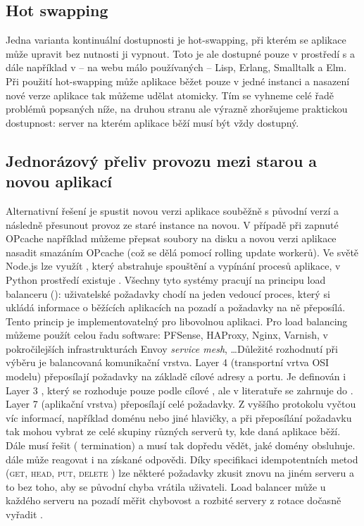         \subsection*{Hot swapping}
            Jedna varianta kontinuální dostupnosti je hot-swapping, při kterém se aplikace může upravit bez nutnosti ji vypnout. Toto je ale dostupné pouze v prostředí s  a dále například v -- na webu málo používaných -- Lisp, Erlang, Smalltalk a Elm. Při použití hot-swapping může aplikace běžet pouze v jedné instanci a nasazení nové verze aplikace tak můžeme udělat atomicky. Tím se vyhneme celé řadě problémů popsaných níže, na druhou stranu ale výrazně zhoršujeme praktickou dostupnost: server na kterém aplikace běží musí být vždy dostupný.

        \subsection*{Jednorázový přeliv provozu mezi starou a novou aplikací}
            \label{deploy-v-jedne-instanci}
            Alternativní řešení je spustit novou verzi aplikace souběžně s původní verzí a následně přesunout provoz ze staré instance na novou. V případě  při zapnuté OPcache například můžeme přepsat soubory na disku a novou verzi aplikace nasadit smazáním OPcache (což se dělá pomocí rolling update  workerů). Ve světě Node.js lze využít , který abstrahuje spouštění a vypínání procesů aplikace, v Python prostředí existuje . Všechny tyto systémy pracují na principu load balanceru (): uživatelské požadavky chodí na jeden vedoucí proces, který si ukládá informace o běžících aplikacích na pozadí a požadavky na ně přeposílá. Tento princip je implementovatelný pro libovolnou aplikaci. Pro load balancing můžeme použít celou řadu software: PFSense, HAProxy, Nginx, Varnish, v pokročilejších infrastrukturách Envoy \textit{service mesh}, \ldots Důležité rozhodnutí při výběru  je balancovaná komunikační vrstva. Layer 4 (transportní vrtva OSI modelu)  přeposílají  požadavky na základě cílové  adresy a portu. Je definován i Layer 3 , který se rozhoduje pouze podle cílové , ale v literatuře se zahrnuje do . Layer 7 (aplikační vrstva)  přeposílají celé \HTTP požadavky. Z vyššího protokolu vyčtou víc informací, například doménu nebo jiné hlavičky, a při přeposílání požadavku tak mohou vybrat ze celé skupiny různých serverů ty, kde daná aplikace běží. Dále   musí řešit  ( termination) a musí tak dopředu vědět, jaké domény obsluhuje.   dále může reagovat i na získané \HTTP odpovědi. Díky \HTTP specifikaci idempotentních metod (\textsc{get}, \textsc{head}, \textsc{put}, \textsc{delete} \cite{http-idempotent}) lze některé požadavky zkusit znovu na jiném serveru a to bez toho, aby se původní chyba vrátila uživateli. Load balancer může u každého serveru na pozadí měřit chybovost a rozbité servery z rotace dočasně vyřadit \cite{nginx-circuit-breaker}.

